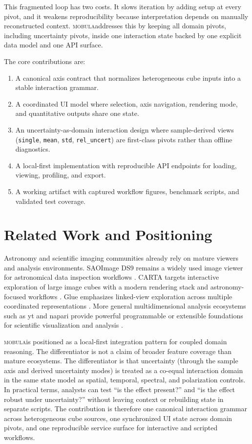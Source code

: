 \documentclass[11pt]{article}
\newcommand{\tool}{\textsc{mobula}}
\begin{document}
This fragmented loop has two costs. It slows iteration by adding setup at every pivot, and it weakens reproducibility because interpretation depends on manually reconstructed context. \tool addresses this by keeping all domain pivots, including uncertainty pivots, inside one interaction state backed by one explicit data model and one API surface.

The core contributions are:
\begin{enumerate}[leftmargin=1.5em]
  \item A canonical axis contract that normalizes heterogeneous cube inputs into a stable interaction grammar.
  \item A coordinated UI model where selection, axis navigation, rendering mode, and quantitative outputs share one state.
  \item An uncertainty-as-domain interaction design where sample-derived views (\texttt{single}, \texttt{mean}, \texttt{std}, \texttt{rel\_uncert}) are first-class pivots rather than offline diagnostics.
  \item A local-first implementation with reproducible API endpoints for loading, viewing, profiling, and export.
  \item A working artifact with captured workflow figures, benchmark scripts, and validated test coverage.
\end{enumerate}

\section{Related Work and Positioning}
Astronomy and scientific imaging communities already rely on mature viewers and analysis environments. SAOImage DS9 remains a widely used image viewer for astronomical data inspection workflows \cite{joye2003ds9}. CARTA targets interactive exploration of large image cubes with a modern rendering stack and astronomy-focused workflows \cite{carta2026}. Glue emphasizes linked-view exploration across multiple coordinated representations \cite{glue2013}. More general multidimensional analysis ecosystems such as yt and napari provide powerful programmable or extensible foundations for scientific visualization and analysis \cite{turk2011yt,napari2019}.

\tool is positioned as a local-first integration pattern for coupled domain reasoning. The differentiator is not a claim of broader feature coverage than mature ecosystems. The differentiator is that uncertainty (through the sample axis and derived uncertainty modes) is treated as a co-equal interaction domain in the same state model as spatial, temporal, spectral, and polarization controls. In practical terms, analysts can test ``is the effect present?'' and ``is the effect robust under uncertainty?'' without leaving context or rebuilding state in separate scripts. The contribution is therefore one canonical interaction grammar across heterogeneous cube sources, one synchronized UI state across domain pivots, and one reproducible service surface for interactive and scripted workflows.
\end{document}
